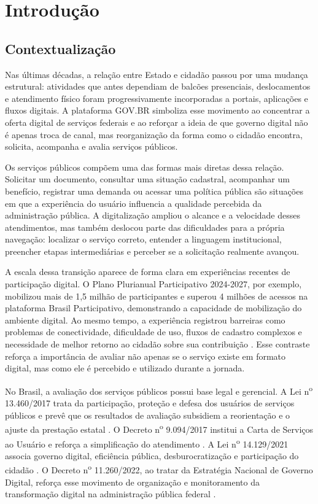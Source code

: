 \chapter{Introdução}

\section{Contextualização}

Nas últimas décadas, a relação entre Estado e cidadão passou por uma mudança
estrutural: atividades que antes dependiam de balcões presenciais, deslocamentos
e atendimento físico foram progressivamente incorporadas a portais, aplicações e
fluxos digitais. A plataforma GOV.BR simboliza esse movimento ao concentrar a
oferta digital de serviços federais e ao reforçar a ideia de que governo digital
não é apenas troca de canal, mas reorganização da forma como o cidadão encontra,
solicita, acompanha e avalia serviços públicos.

Os serviços públicos compõem uma das formas mais diretas dessa relação. Solicitar
um documento, consultar uma situação cadastral, acompanhar um benefício,
registrar uma demanda ou acessar uma política pública são situações em que a
experiência do usuário influencia a qualidade percebida da administração
pública. A digitalização ampliou o alcance e a velocidade desses atendimentos,
mas também deslocou parte das dificuldades para a própria navegação: localizar o
serviço correto, entender a linguagem institucional, preencher etapas
intermediárias e perceber se a solicitação realmente avançou.

A escala dessa transição aparece de forma clara em experiências recentes de
participação digital. O Plano Plurianual Participativo 2024-2027, por exemplo,
mobilizou mais de 1,5 milhão de participantes e superou 4 milhões de acessos na
plataforma Brasil Participativo, demonstrando a capacidade de mobilização do
ambiente digital. Ao mesmo tempo, a experiência registrou barreiras como
problemas de conectividade, dificuldade de uso, fluxos de cadastro complexos e
necessidade de melhor retorno ao cidadão sobre sua contribuição
\cite{brasilMgi2024ppaParticipativo}. Esse contraste reforça a importância de
avaliar não apenas se o serviço existe em formato digital, mas como ele é
percebido e utilizado durante a jornada.

No Brasil, a avaliação dos serviços públicos possui base legal e gerencial. A
Lei n\textsuperscript{o} 13.460/2017 trata da participação, proteção e defesa dos
usuários de serviços públicos e prevê que os resultados de avaliação subsidiem a
reorientação e o ajuste da prestação estatal \cite{brasil2017lei13460}. O
Decreto n\textsuperscript{o} 9.094/2017 institui a Carta de Serviços ao Usuário
e reforça a simplificação do atendimento \cite{brasil2017decreto9094}. A Lei
n\textsuperscript{o} 14.129/2021 associa governo digital, eficiência pública,
desburocratização e participação do cidadão \cite{brasil2021lei14129}. O Decreto
n\textsuperscript{o} 11.260/2022, ao tratar da Estratégia Nacional de Governo
Digital, reforça esse movimento de organização e monitoramento da transformação
digital na administração pública federal \cite{brasil2022decreto11260}.

